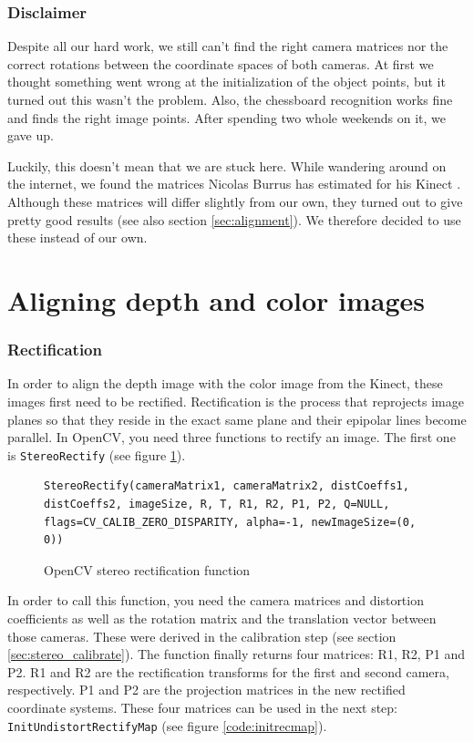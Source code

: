\subsubsection{Disclaimer}
Despite all our hard work, we still can't find the right camera matrices nor the correct rotations between the coordinate spaces of both cameras. At first we thought something went wrong at the initialization of the object points, but it turned out this wasn't the problem. Also, the chessboard recognition works fine and finds the right image points. After spending two whole weekends on it, we gave up.

Luckily, this doesn't mean that we are stuck here. While wandering around on the internet, we found the matrices Nicolas Burrus has estimated for his Kinect \cite{RGBDEMO}. Although these matrices will differ slightly from our own, they turned out to give pretty good results (see also section \ref{sec:alignment}). We therefore decided to use these instead of our own.


\section{Aligning depth and color images}

\subsubsection{Rectification}
In order to align the depth image with the color image from the Kinect, these images first need to be rectified. Rectification is the process that reprojects image planes so that they reside in
the exact same plane and their epipolar lines become parallel. In OpenCV, you need three functions to rectify an image. The first one is \verb|StereoRectify| (see figure \ref{code:stereorectify}).

\begin{figure}[H]
\begin{lstlisting}
StereoRectify(cameraMatrix1, cameraMatrix2, distCoeffs1, distCoeffs2, imageSize, R, T, R1, R2, P1, P2, Q=NULL, flags=CV_CALIB_ZERO_DISPARITY, alpha=-1, newImageSize=(0, 0))
\end{lstlisting}
\caption{OpenCV stereo rectification function}
\label{code:stereorectify}
\end{figure}

In order to call this function, you need the camera matrices and distortion coefficients as well as the rotation matrix and the translation vector between those cameras. These were derived in the calibration step (see section \ref{sec:stereo_calibrate}). The function finally returns four matrices: R1, R2, P1 and P2. R1 and R2 are the rectification transforms for the first and second camera, respectively. P1 and P2 are the projection matrices in the new rectified coordinate systems. These four matrices can be used in the next step: \verb|InitUndistortRectifyMap| (see figure \ref{code:initrecmap}).

